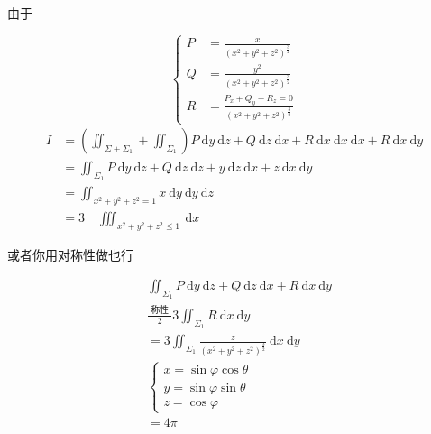 \documentclass[10pt]{article}
\begin{document}
\begin{CJK}{UTF8}{mj}由于\end{CJK}
$$
\left\{\begin{aligned}
P &=\frac{x}{\left(x^{2}+y^{2}+z^{2}\right)^{\frac{3}{2}}} \\
Q &=\frac{y^{2}}{\left(x^{2}+y^{2}+z^{2}\right)^{\frac{3}{2}}} \\
R &=\frac{P_{x}+Q_{y}+R_{z}=0}{\left(x^{2}+y^{2}+z^{2}\right)^{\frac{3}{2}}}
\end{aligned}\right.
$$
$$
\begin{aligned}
I &=\left(\iint_{\Sigma+\Sigma_{1}}+\iint_{\Sigma_{1}}\right) P \mathrm{~d} y \mathrm{~d} z+Q \mathrm{~d} z \mathrm{~d} x+R \mathrm{~d} x \mathrm{~d} x \mathrm{~d} x+R \mathrm{~d} x \mathrm{~d} y \\
&=\iint_{\Sigma_{1}} P \mathrm{~d} y \mathrm{~d} z+Q \mathrm{~d} z \mathrm{~d} z+y \mathrm{~d} z \mathrm{~d} x+z \mathrm{~d} x \mathrm{~d} y \\
&=\iint_{x^{2}+y^{2}+z^{2}=1} x \mathrm{~d} y \mathrm{~d} y \mathrm{~d} z \\
&=3 \quad \iiint_{x^{2}+y^{2}+z^{2} \leq 1} \mathrm{~d} x
\end{aligned}
$$
\begin{CJK}{UTF8}{mj}或者你用对称性做也行\end{CJK}
$$
\begin{aligned}
&\iint_{\Sigma_{1}} P \mathrm{~d} y \mathrm{~d} z+Q \mathrm{~d} z \mathrm{~d} x+R \mathrm{~d} x \mathrm{~d} y \\
&\frac{\text { 称性 }}{2} 3 \iint_{\Sigma_{1}} R \mathrm{~d} x \mathrm{~d} y \\
&=3 \iint_{\Sigma_{1}} \frac{z}{\left(x^{2}+y^{2}+z^{2}\right)^{\frac{3}{2}}} \mathrm{~d} x \mathrm{~d} y \\
&\left\{\begin{array}{l}
x=\sin \varphi \cos \theta \\
y=\sin \varphi \sin \theta \\
z=\cos \varphi
\end{array}\right. \\
&=4 \pi
\end{aligned}
$$
\end{document}
